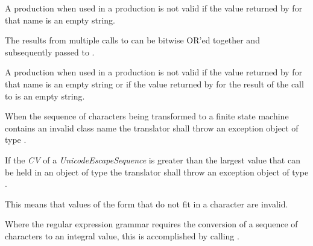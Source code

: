 \pnum
{}%
%
A  production when used in
a  production is not valid
if the value returned by  for
that name is an empty string.

\pnum
{}%
%
%
%
The results from multiple calls
to  can be bitwise OR'ed
together and subsequently passed to .

\pnum
{}%
%
A  production when used in
a  production is not valid if the value
returned by  for that name is an
empty string or if the value returned by 
for the result of the call to 
is an empty string.

\pnum
{}%
When the sequence of characters being transformed to a finite state
machine contains an invalid class name the translator shall throw an
exception object of type .

\pnum
{}%
If the \textit{CV} of a \textit{UnicodeEscapeSequence} is greater than the largest
value that can be held in an object of type  the translator shall
throw an exception object of type . \begin{note}
This means that values of the form  that do not fit in
a character are invalid.  \end{note}

\pnum
Where the regular expression grammar requires the conversion of a sequence of characters
to an integral value, this is accomplished by calling .

